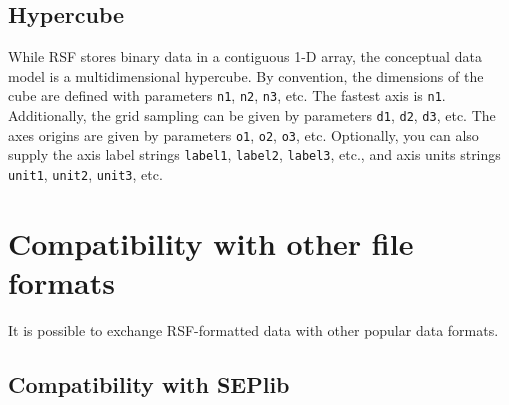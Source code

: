 \subsection{Hypercube}

While RSF stores binary data in a contiguous 1-D array, the conceptual
data model is a multidimensional hypercube. By convention, the
dimensions of the cube are defined with parameters \texttt{n1},
\texttt{n2}, \texttt{n3}, etc.  The fastest axis is \texttt{n1}.
Additionally, the grid sampling can be given by parameters
\texttt{d1}, \texttt{d2}, \texttt{d3}, etc. The axes origins are given
by parameters \texttt{o1}, \texttt{o2}, \texttt{o3}, etc. Optionally,
you can also supply the axis label strings \texttt{label1},
\texttt{label2}, \texttt{label3}, etc., and axis units strings
\texttt{unit1}, \texttt{unit2}, \texttt{unit3}, etc. 

\section{Compatibility with other file formats}

It is possible to exchange RSF-formatted data with other popular data formats.

\subsection{Compatibility with SEPlib}

